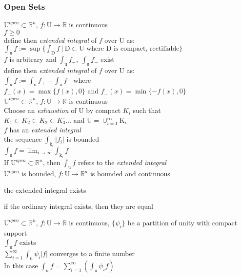 \subsubsection{Open Sets}
\LET $\mathrm{U}^{open}\subset\mathbb{R}^n$,
$f:\mathrm{U}\to\mathbb{R}$ is continuous\\
\IF $f\geq 0$\\
\THEN define then \textit{extended integral} of $f$ over U as:\\
$\int_{\mathrm{u}}f := \sup\{\int_{\mathrm{D}}f\:|\:
\mathrm{D}\subset\mathrm{U}\text{ where } \mathrm{D}\text{ is compact, rectifiable} \}$\\
\IF $f$ is arbitrary and
 $\int_{\mathrm{u}}f_+,\;\int_{\mathrm{u}}f_-$ exist\\
\THEN define then \textit{extended integral} of $f$ over U as:\\
$\int_{\mathrm{u}}f:=\int_{\mathrm{u}}f_+-\int_{\mathrm{u}}f_-$ where\\
$f_+(x)=\max\{f(x),0\}$ and $f_-(x)=\min\{-f(x), 0\}$\\

\LET $\mathrm{U}^{open}\subset\mathbb{R}^n$,
$f:\mathrm{U}\to\mathbb{R}$ is continuous\\
Choose an \textit{exhaustion} of U by compact $K_i$ such that\\
$K_1\subset K_2^{\circ}\subset K_2\subset K_3^{\circ}\ldots$ and 
$\mathrm{U}=\cup_{i=1}^{\infty}\mathrm{K}_i$\\
$f$ has an \textit{extended integral}\\
\IFF the sequence $\int_{\mathrm{k}_i}|f_i|$ is bounded\\
\THEN $\int_{\mathrm{u}}f=\lim_{i\to\infty}\int_{\mathrm{k}_i}f$\\

\RMK
If $\mathrm{U}^{open}\subset\mathbb{R}^n$, then $\int_{\mathrm{u}}f$ refers to the
\textit{extended integral}\\

\LET
 $\mathrm{U^{open}}$ is bounded,
$f:\mathrm{U}\to\mathbb{R}^n $ is bounded and continuous\\
\THEN
\begin{myenumerate}
\item the extended integral exists
\item if the ordinary integral exists, then they are equal
\end{myenumerate}

\LET
$\mathrm{U}^{open}\subset\mathbb{R}^n$,
$f:\mathrm{U}\to\mathbb{R}$ is continuous,
$\{\psi_i\}$ be a partition of unity with compact support\\
\THEN $\int_{\mathrm{u}}f$ exists\\
\IFF $\sum_{i=1}^{\infty}\int_{\mathrm{u}}\psi_i|f|$ converges to a finite number\\
In this case $\int_{\mathrm{u}}f =\sum\limits_{i=1}^
\infty(\int_{\mathrm{u}}\psi_i f)$\\
